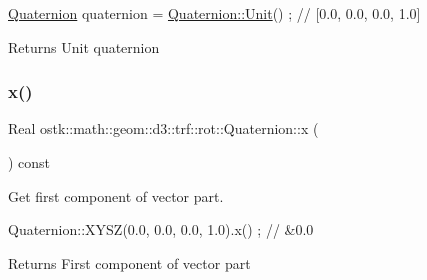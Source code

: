 \begin{DoxyCode}
\hyperlink{classostk_1_1math_1_1geom_1_1d3_1_1trf_1_1rot_1_1_quaternion_ad9fd7d8eb5effb4d4e0394bbb5bb86dc}{Quaternion} quaternion = \hyperlink{classostk_1_1math_1_1geom_1_1d3_1_1trf_1_1rot_1_1_quaternion_ad408cbb3545268b2815c15f12abdbc8b}{Quaternion::Unit}() ; \textcolor{comment}{// [0.0, 0.0, 0.0, 1.0]}
\end{DoxyCode}


\begin{DoxyReturn}{Returns}
Unit quaternion 
\end{DoxyReturn}
\mbox{\label{classostk_1_1math_1_1geom_1_1d3_1_1trf_1_1rot_1_1_quaternion_a894bf65f86e57876fb498dd1fffc458d}} 
\subsubsection{\texorpdfstring{x()}{x()}}
{\footnotesize\ttfamily Real ostk\+::math\+::geom\+::d3\+::trf\+::rot\+::\+Quaternion\+::x (\begin{DoxyParamCaption}{ }\end{DoxyParamCaption}) const}



Get first component of vector part. 


\begin{DoxyCode}
Quaternion::XYSZ(0.0, 0.0, 0.0, 1.0).x() ; \textcolor{comment}{// &0.0}
\end{DoxyCode}


\begin{DoxyReturn}{Returns}
First component of vector part 
\end{DoxyReturn}
\mbox{\label{classostk_1_1math_1_1geom_1_1d3_1_1trf_1_1rot_1_1_quaternion_ac57ea57a4033622ed1389101b2e58c76}} 
